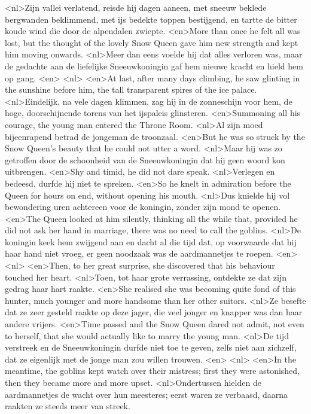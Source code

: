 <nl>Zijn vallei verlatend, reisde hij dagen aaneen, met sneeuw beklede bergwanden beklimmend, met ijs bedekte toppen bestijgend, en tartte de bitter koude wind die door de alpendalen zwiepte.
<en>More than once he felt all was lost, but the thought of the lovely Snow Queen gave him new strength and kept him moving onwards.
<nl>Meer dan eens voelde hij dat alles verloren was, maar de gedachte aan de liefelijke Sneeuwkoningin gaf hem nieuwe kracht en hield hem op gang.
<en>
<nl>
<en>At last, after many days climbing, he saw glinting in the sunshine before him, the tall transparent spires of the ice palace.
<nl>Eindelijk, na vele dagen klimmen, zag hij in de zonneschijn voor hem, de hoge, doorschijnende torens van het ijspaleis  glinsteren.
<en>Summoning all his courage, the young man entered the Throne Room.
<nl>Al zijn moed bijeenrapend betrad de jongeman de troonzaal.
<en>But he was so struck by the Snow Queen’s beauty that he could not utter a word.
<nl>Maar hij was zo getroffen door de schoonheid van de Sneeuwkoningin dat hij geen woord kon uitbrengen.
<en>Shy and timid, he did not dare speak.
<nl>Verlegen en bedeesd, durfde hij niet te spreken.
<en>So he knelt in admiration before the Queen for hours on end, without opening his mouth.
<nl>Dus knielde hij  vol bewondering uren achtereen voor de koningin, zonder zijn mond te openen.
<en>The Queen looked at him silently, thinking all the while that, provided he did not ask her hand in marriage, there was no need to call the goblins.
<nl>De koningin keek hem zwijgend aan en dacht al die tijd dat, op voorwaarde dat hij haar hand niet vroeg, er geen noodzaak was de aardmannetjes te roepen.
<en>
<nl>
<en>Then, to her great surprise, she discovered that his behaviour touched her heart.
<nl>Toen, tot haar grote verrassing,  ontdekte ze dat zijn gedrag haar hart raakte.
<en>She realised she was becoming quite fond of this hunter, much younger and more handsome than her other suitors.
<nl>Ze besefte dat ze zeer gesteld raakte op deze jager, die veel jonger en knapper was dan haar andere vrijers.
<en>Time passed and the Snow Queen dared not admit, not even to herself, that she would actually like to marry the young man.
<nl>De tijd verstreek en de Sneeuwkoningin durfde niet toe te geven, zelfs niet aan zichzelf, dat ze eigenlijk met de jonge man zou willen trouwen.
<en>
<nl>
<en>In the meantime, the goblins kept watch over their mistress; first they were astonished, then they became more and more upset.
<nl>Ondertussen hielden de aardmannetjes de wacht over hun meesteres; eerst waren ze verbaasd, daarna raakten ze steeds meer van streek.
